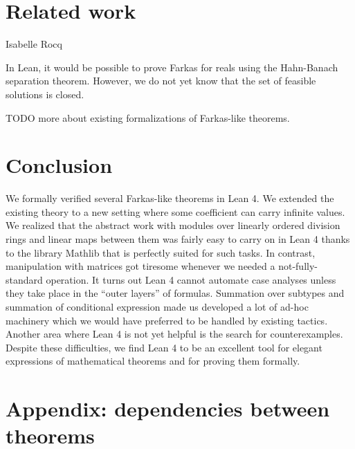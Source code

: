 \documentclass[]{article}
\renewcommand{\.}{\hskip .75pt}
\begin{document}
\section {Related work}

Isabelle \cite{Farkas-AFP} \cite{Linear-AFP} \cite{Duality-AFP}
Rocq \cite{Simplex-Coq}

In Lean, it would be possible to prove Farkas for reals using the
Hahn-Banach separation theorem. However, we do not yet know that
the set of feasible solutions is closed.

TODO more about existing formalizations of Farkas-like theorems.


\section {Conclusion}

We formally verified several Farkas-like theorems in Lean 4.
We extended the existing theory to a new setting where some
coefficient can carry infinite values. We realized that the
abstract work with modules over linearly ordered division rings
and linear maps between them was fairly easy to carry on in
Lean 4 thanks to the library Mathlib that is perfectly suited
for such tasks. In contrast, manipulation with matrices got
tiresome whenever we needed a not-fully-standard operation.
It turns out Lean 4 cannot automate case analyses unless they
take place in the ``outer layers'' of formulas. Summation
over subtypes and summation of conditional expression made
us developed a lot of ad-hoc machinery which we would have
preferred to be handled by existing tactics. Another area
where Lean 4 is not yet helpful is the search for counterexamples.
Despite these difficulties, we find Lean 4 to be an excellent
tool for elegant expressions of mathematical theorems and
for proving them formally.







%

\section{Appendix: dependencies between theorems}
\end{document}
